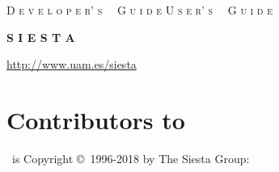 


\date{\today}




\begin{titlepage}

\begin{center}

\vspace{1cm}
\ifdeveloper
 {\Huge \textsc{D e v e l o p e r' s \, \, G u i d e}}
\else
 {\Huge \textsc{U s e r' s \, \, G u i d e}}
\fi

\vspace{1cm}
\hrulefill
\vspace{1cm}

{\Huge \textbf{S I E S T A \, \, }}

\vspace{1cm}
\hrulefill
\vspace{0.5cm}

{\Large \printdate}

\vspace{1.5cm}
{\Large \url{http://www.uam.es/siesta}}

\end{center}

\end{titlepage}


\newpage


\section*{Contributors to \siesta}

\siesta\ is Copyright \copyright\ 1996-2018 by The Siesta Group:
\vspace{0.5cm}

